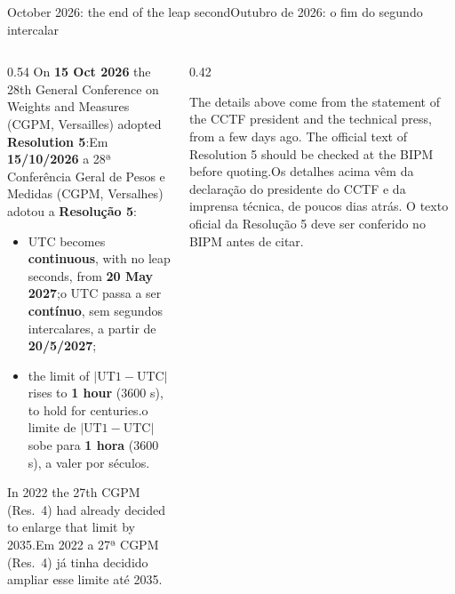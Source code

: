 \documentclass[aspectratio=169,11pt]{beamer}
\newcommand{\tr}[2]{\ifEN#2\else#1\fi}
\newcommand{\bnum}[1]{\textbf{\textcolor{mTeal}{#1}}}
\begin{document}
\begin{frame}{\tr{Outubro de 2026: o fim do segundo intercalar}{October 2026: the end of the leap second}}
  \begin{columns}[T]
    \begin{column}{0.54\textwidth}
      \small
      \tr{Em \bnum{15/10/2026} a 28ª Conferência Geral de Pesos e Medidas (CGPM, Versalhes) adotou a \bnum{Resolução 5}:}{On \bnum{15 Oct 2026} the 28th General Conference on Weights and Measures (CGPM, Versailles) adopted \bnum{Resolution 5}:}
      \begin{itemize}
        \setlength{\itemsep}{3pt}
        \item \tr{o UTC passa a ser \bnum{contínuo}, sem segundos intercalares, a partir de \bnum{20/5/2027};}{UTC becomes \bnum{continuous}, with no leap seconds, from \bnum{20 May 2027};}
        \item \tr{o limite de $|\text{UT1}-\text{UTC}|$ sobe para \bnum{1 hora} ($\num{3600}$ s), a valer por séculos.}{the limit of $|\text{UT1}-\text{UTC}|$ rises to \bnum{1 hour} ($\num{3600}$ s), to hold for centuries.}
      \end{itemize}
      \tr{Em 2022 a 27ª CGPM (Res.~4) já tinha decidido ampliar esse limite até 2035.}{In 2022 the 27th CGPM (Res.~4) had already decided to enlarge that limit by 2035.}
    \end{column}
    \begin{column}{0.42\textwidth}
      \begin{armadilha}[title={\tr{Nota de rigor}{Note on rigor}}]
        \footnotesize\tr{Os detalhes acima vêm da declaração do presidente do CCTF e da imprensa técnica, de poucos dias atrás. O \alert{texto oficial} da Resolução 5 deve ser conferido no BIPM antes de citar.}{The details above come from the statement of the CCTF president and the technical press, from a few days ago. The \alert{official text} of Resolution 5 should be checked at the BIPM before quoting.}
      \end{armadilha}
    \end{column}
  \end{columns}
\end{frame}
\end{document}

